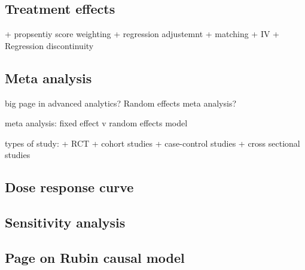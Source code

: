 
\subsection{Treatment effects}

+ propsentiy score weighting
+ regression adjustemnt
+ matching
+ IV
+ Regression discontinuity

\subsection{Meta analysis}
big page in advanced analytics?
Random effects meta analysis?

meta analysis: fixed effect v random effects model

types of study:
+ RCT
+ cohort studies
+ case-control studies
+ cross sectional studies

\subsection{Dose response curve}

\subsection{Sensitivity analysis}

\subsection{Page on Rubin causal model}

